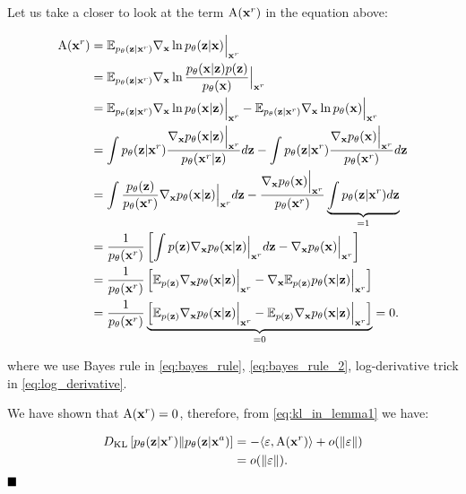 Let us take a closer to look at the term $\text{A}({\mathbf{x}}^r)$ in the equation above:

\begin{align}
\text{A}(\rvx^r) &=    \E_{p_{\theta}(\rvz|\rvx^r)}  \nabla_{\rvx} \ln p_{\theta}(\rvz|\rvx) \Big|_{\rvx^r} \\
&=  \E_{p_{\theta}(\rvz|\rvx^r)}  \nabla_{\rvx} \ln \frac{p_{\theta}(\rvx|\rvz)p(\rvz)}{p_{\theta}(\rvx)} \Big|_{\rvx^r}   \label{eq:bayes_rule}  \\
&= \E_{p_{\theta}(\rvz|\rvx^r)}  \nabla_{\rvx} \ln p_{\theta}(\rvx|\rvz) \Big|_{\rvx^r} - \E_{p_{\theta}(\rvz|\rvx^r)}  \nabla_{\rvx} \ln p_{\theta}(\rvx) \Big|_{\rvx^r} \\
&= \int p_{\theta}(\rvz|\rvx^r)\frac{\nabla_{\rvx} p_{\theta}(\rvx|\rvz)\Big|_{\rvx^r}}{p_{\theta}(\rvx^r|\rvz)}d\rvz - \int p_{\theta}(\rvz|\rvx^r)\frac{\nabla_{\rvx} p_{\theta}(\rvx)\Big|_{\rvx^r}}{p_{\theta}(\rvx^r)} d\rvz  
\label{eq:log_derivative}\\
&= \int \frac{p_{\theta}(\rvz)}{p_{\theta}(\rvx^r)} \nabla_{\rvx} p_{\theta}(\rvx|\rvz)\Big|_{\rvx^r} d\rvz - \frac{\nabla_{\rvx} p_{\theta}(\rvx)\Big|_{\rvx^r}}{p_{\theta}(\rvx^r)}  \underbrace{\int p_{\theta}(\rvz|\rvx^r)d\rvz }_{=1}  \label{eq:bayes_rule_2} \\
&= \frac{1}{p_{\theta}(\rvx^r)} \left[ \int p(\rvz) \nabla_{\rvx} p_{\theta}(\rvx|\rvz)\Big|_{\rvx^r} d\rvz - \nabla_{\rvx} p_{\theta}(\rvx)\Big|_{\rvx^r} \right]\\
&= \frac{1}{p_{\theta}(\rvx^r)} \left[ \E_{p(\rvz)} \nabla_{\rvx} p_{\theta}(\rvx|\rvz)\Big|_{\rvx^r} - \nabla_{\rvx} \E_{p(\rvz)}p_{\theta}(\rvx|\rvz)\Big|_{\rvx^r} \right]\\
&= \frac{1}{p_{\theta}(\rvx^r)}  \underbrace{\left[ \E_{p(\rvz)} \nabla_{\rvx} p_{\theta}(\rvx|\rvz)\Big|_{\rvx^r} -  \E_{p(\rvz)}\nabla_{\rvx} p_{\theta}(\rvx|\rvz)\Big|_{\rvx^r} \right]}_{=0} = 0.
\end{align}

where we use Bayes rule in \ref{eq:bayes_rule}, \ref{eq:bayes_rule_2}, log-derivative trick in \ref{eq:log_derivative}. 

We have shown that $\text{A}({\mathbf{x}}^r) = 0$, therefore, from \eqref{eq:kl_in_lemma1} we have:
 
\begin{align}
    D_{\mathrm{KL}}\left[p_{\theta}({\mathbf{z}}|{\mathbf{x}}^r)\|p_{\theta}({\mathbf{z}}|{\mathbf{x}}^a)\right] &= -\langle \varepsilon, \text{A}({\mathbf{x}}^r) \rangle + o(\|\varepsilon\|) \\
    &= o(\|\varepsilon\|). 
\end{align}
$\hfill\blacksquare$

